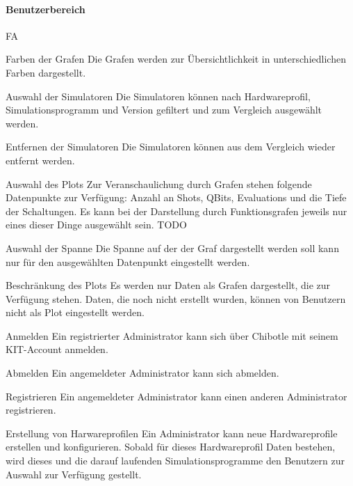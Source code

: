 \paragraph{Benutzerbereich}
\begin{Kriterien}{FA}
    
    \item[Farben der Grafen] Die Grafen werden zur Übersichtlichkeit in unterschiedlichen Farben dargestellt.

    \item[Auswahl der Simulatoren] Die Simulatoren können nach Hardwareprofil, Simulationsprogramm und Version gefiltert und zum Vergleich ausgewählt werden.

    \item[Entfernen der Simulatoren] Die Simulatoren können aus dem Vergleich wieder entfernt werden.

    \item[Auswahl des Plots] Zur Veranschaulichung durch Grafen stehen folgende Datenpunkte zur Verfügung: Anzahl an Shots, QBits, Evaluations und die Tiefe der Schaltungen. Es kann bei der Darstellung durch Funktionsgrafen jeweils nur eines dieser Dinge ausgewählt sein. TODO

    \item[Auswahl der Spanne] Die Spanne auf der der Graf dargestellt werden soll kann nur für den ausgewählten Datenpunkt eingestellt werden.

    \item[Beschränkung des Plots] Es werden nur Daten als Grafen dargestellt, die zur Verfügung stehen. Daten, die noch nicht erstellt wurden, können von Benutzern nicht als Plot eingestellt werden.



    \item[Anmelden] Ein registrierter Administrator kann sich über Chibotle mit seinem KIT-Account anmelden. 

    \item[Abmelden] Ein angemeldeter Administrator kann sich abmelden.

    \item[Registrieren] Ein angemeldeter Administrator kann einen anderen Administrator registrieren. 
    


    \item[Erstellung von Harwareprofilen] Ein Administrator kann neue Hardwareprofile erstellen und konfigurieren. Sobald für dieses Hardwareprofil Daten bestehen, wird dieses und die darauf laufenden Simulationsprogramme den Benutzern zur Auswahl zur Verfügung gestellt.


\end{Kriterien}
